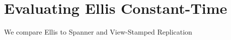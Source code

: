 \section{Evaluating Ellis Constant-Time}
We compare Ellis to Spanner and View-Stamped Replication




 